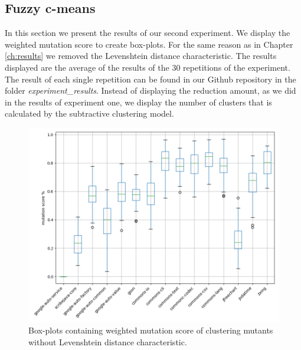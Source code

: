 \documentclass[conference,draftclsnofoot,onecolumn]{IEEEtran}
\begin{document}
\subsection{Fuzzy c-means}
\label{ch:results_rq2}
In this section we present the results of our second experiment.
We display the weighted mutation score to create box-plots.
For the same reason as in Chapter \ref{ch:results} we removed the Levenshtein distance characteristic.
\newline
The results displayed are the average of the results of the 30 repetitions of the experiment.
The result of each single repetition can be found in our Github repository in the folder \textit{experiment{\_}results}\cite{rbasarat-repo}.
Instead of displaying the reduction amount, as we did in the results of experiment one, we display the number of clusters that is calculated by the subtractive clustering model.

\begin{figure}[ht]
\includegraphics[width=0.5 \textwidth]{images/fcm_summary/fcm_no_distance.png}
\caption{\label{box:clustering_fcm_no_distance_25}Box-plots containing weighted mutation score of clustering mutants without Levenshtein distance characteristic.}
\end{figure}
\end{document}
